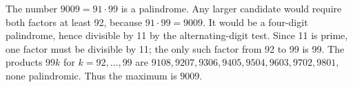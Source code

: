 The number $9009=91\cdot99$ is a palindrome. Any larger candidate would require both factors at least 92, because $91\cdot99=9009$. It would be a four-digit palindrome, hence divisible by 11 by the alternating-digit test. Since 11 is prime, one factor must be divisible by 11; the only such factor from 92 to 99 is 99. The products $99k$ for $k=92,\ldots,99$ are $9108,9207,9306,9405,9504,9603,9702,9801$, none palindromic. Thus the maximum is $\boxed{9009}$.

